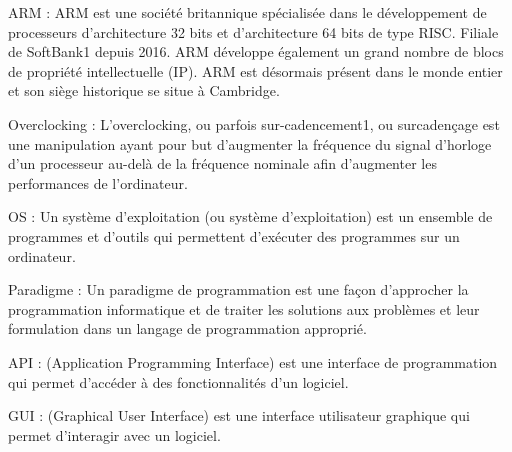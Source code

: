 
\begin{definition}
    \newcommand{\lab}[1]{(\ref{#1})}

    ARM : ARM est une société britannique spécialisée dans le développement de processeurs d'architecture 32 bits et d'architecture 64 bits de type RISC. Filiale de SoftBank1 depuis 2016. ARM développe également un grand nombre de blocs de propriété intellectuelle (IP). ARM est désormais présent dans le monde entier et son siège historique se situe à Cambridge.

    \label{def:ARM}
\end{definition}


\begin{definition}
    \newcommand{\lab}[2]{(\ref{#2})}

    Overclocking : L'overclocking, ou parfois sur-cadencement1, ou surcadençage est une manipulation ayant pour but d'augmenter la fréquence du signal d'horloge d'un processeur au-delà de la fréquence nominale afin d'augmenter les performances de l'ordinateur.

    \label{def:Overclocking}
\end{definition}

\begin{definition}
    \newcommand{\lab}[3]{(\ref{#3})}

    OS : Un système d'exploitation (ou système d'exploitation) est un ensemble de programmes et d'outils qui permettent d'exécuter des programmes sur un ordinateur.

    \label{def:OS}
\end{definition}

\begin{definition}
    \newcommand{\lab}[4]{(\ref{#4})}

    Paradigme : Un paradigme de programmation est une façon d'approcher la programmation informatique et de traiter les solutions aux problèmes et leur formulation dans un langage de programmation approprié.

    \label{def:Paradigme}
\end{definition}

\begin{definition}
    \newcommand{\lab}[5]{(\ref{#5})}

    API : (Application Programming Interface) est une interface de programmation qui permet d'accéder à des fonctionnalités d'un logiciel.

    \label{def:API}
\end{definition}

\begin{definition}
    \newcommand{\lab}[6]{(\ref{#6})}

    GUI : (Graphical User Interface) est une interface utilisateur graphique qui permet d'interagir avec un logiciel.

    \label{def:GUI}
\end{definition}

